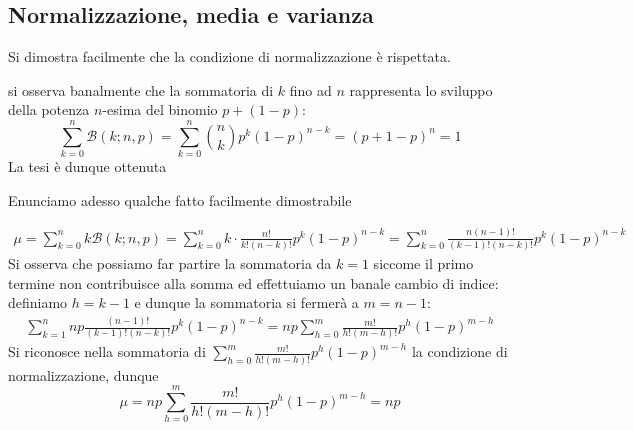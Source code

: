 \documentclass{report}
\begin{document}
\subsection{Normalizzazione, media e varianza}
Si dimostra facilmente che la condizione di normalizzazione  è rispettata.
\begin{myproof}
si osserva banalmente che la sommatoria di $k$ fino ad $n$ rappresenta lo sviluppo della potenza $n$-esima del binomio $p+(1-p)$:
$$
\sum_{k=0}^n \mathcal{B}(k;n,p) = \sum_{k=0}^n \binom{n}{k} p^k (1-p)^{n-k} = (p + 1 - p)^{n} = 1
$$
La tesi è dunque ottenuta
\end{myproof}
\noindent Enunciamo adesso qualche fatto facilmente dimostrabile
\begin{myproof} 

\begin{align*}
	\mu = \sum_{k=0}^n k \mathcal{B}(k;n,p) = \sum_{k=0}^n k \cdot \frac{n!}{k!(n-k)!} p^k (1-p)^{n-k} = \sum_{k=0}^n \frac{n(n-1)!}{(k-1)!(n-k)!}p^k(1-p)^{n-k}
\end{align*}
Si osserva che possiamo far partire la sommatoria da $k=1$ siccome il primo termine non contribuisce alla somma ed effettuiamo un banale cambio di indice: definiamo $h=k-1$ e dunque la sommatoria si fermerà a $m=n-1$:
\begin{align*}
	\sum_{k=1}^{n} np \frac{(n-1)!}{(k-1)!(n-k)!}p^k (1-p)^{n-k} = np\sum_{h=0}^{m} \frac{m!}{h!(m-h)!}p^h (1-p)^{m-h}
\end{align*}
Si riconosce nella sommatoria di $\sum\limits_{h=0}^m \frac{m!}{h!(m-h)!}p^h(1-p)^{m-h}$ la condizione di normalizzazione, dunque
$$
	\mu = np\sum_{h=0}^m \frac{m!}{h!(m-h)!} p^h (1-p)^{m-h} = np
$$
\end{myproof}
\end{document}
